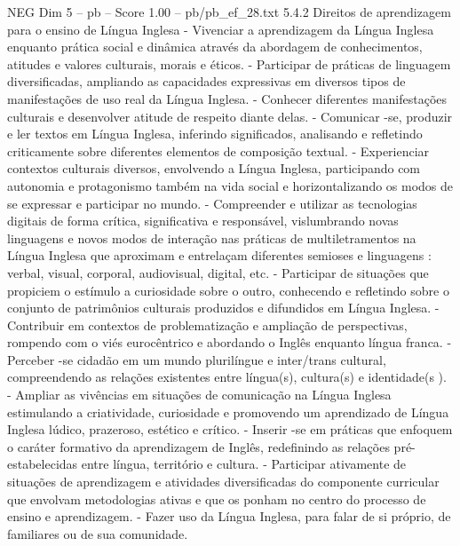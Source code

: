 \begin{textsample}{NEG Dim 5 – pb – Score 1.00 – pb/pb\_ef\_28.txt}  \label{ex:f5_neg_200}
5.4.2 Direitos de aprendizagem para o ensino de Língua Inglesa - Vivenciar a aprendizagem da Língua Inglesa enquanto prática social e dinâmica através da abordagem de conhecimentos, atitudes e valores culturais, morais e éticos. - Participar de práticas de linguagem diversificadas, ampliando as capacidades expressivas em diversos tipos de manifestações de uso real da Língua Inglesa. - Conhecer diferentes manifestações culturais e desenvolver atitude de respeito diante delas. - Comunicar -se, produzir e ler textos em Língua Inglesa, inferindo significados, analisando e refletindo criticamente sobre diferentes elementos de composição textual. - Experienciar contextos culturais diversos, envolvendo a Língua Inglesa, participando com autonomia e protagonismo também na vida social e horizontalizando os modos de se expressar e participar no mundo. - Compreender e utilizar as tecnologias digitais de forma crítica, significativa e responsável, vislumbrando novas linguagens e novos modos de interação nas práticas de multiletramentos na Língua Inglesa que aproximam e entrelaçam diferentes semioses e linguagens : verbal, visual, corporal, audiovisual, digital, etc. - Participar de situações que propiciem o estímulo a curiosidade sobre o outro, conhecendo e refletindo sobre o conjunto de patrimônios culturais produzidos e difundidos em Língua Inglesa. - Contribuir em contextos de problematização e ampliação de perspectivas, rompendo com o viés eurocêntrico e abordando o Inglês enquanto língua franca. - Perceber -se cidadão em um mundo plurilíngue e inter/trans cultural, compreendendo as relações existentes entre língua(s), cultura(s) e identidade(s ). - Ampliar as vivências em situações de comunicação na Língua Inglesa estimulando a criatividade, curiosidade e promovendo um aprendizado de Língua Inglesa lúdico, prazeroso, estético e crítico. - Inserir -se em práticas que enfoquem o caráter formativo da aprendizagem de Inglês, redefinindo as relações pré-estabelecidas entre língua, território e cultura. - Participar ativamente de situações de aprendizagem e atividades diversificadas do componente curricular que envolvam metodologias ativas e que os ponham no centro do processo de ensino e aprendizagem. - Fazer uso da Língua Inglesa, para falar de si próprio, de familiares ou de sua comunidade.

\end{textsample}
